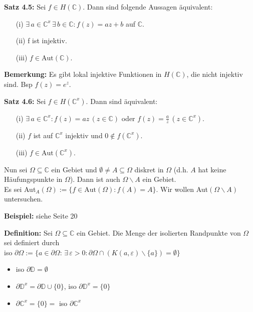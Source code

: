 \documentclass[11pt]{article}
\newcommand{\C}{\mathbb{C}}
\newcommand{\D}{\mathbb{D}}
\begin{document}
\textbf{Satz 4.5:} Sei $f \in H(\C)$. Dann sind folgende Aussagen äquivalent:
\vspace{-0.6cm}
\begin{itemize}
\item[(i)] $\exists \, a \in \C^x \, \exists \, b \in \C \colon f(z) = az + b$ auf $\C$. \vspace{-0.2cm}
\item[(ii)] f ist injektiv. \vspace{-0.2cm}
\item[(iii)] $f \in \text{Aut}(\C)$.
\end{itemize}
\vspace{-0.3cm}

\textbf{Bemerkung:} Es gibt lokal injektive Funktionen in $H(\C)$, die nicht injektiv sind. Bsp $f(z) = e^z$.

\textbf{Satz 4.6:} Sei $f \in H(\C^x)$. Dann sind äquivalent:
\vspace{-0.6cm}
\begin{itemize}
\item[(i)] $\exists \, a \in \C^x \colon f(z) = az \, (z \in \C)$ oder $f(z) = \frac{a}{z} \, (z \in \C^x)$. \vspace{-0.2cm}
\item[(ii)] $f$ ist auf $\C^x$ injektiv und $0 \notin f(\C^x)$. \vspace{-0.2cm}
\item[(iii)] $f \in \text{Aut}(\C^x)$.
\end{itemize}
\vspace{-0.3cm}

Nun sei $\Omega \subseteq \C$ ein Gebiet und $\emptyset \neq A \subseteq \Omega$ diskret in $\Omega$ (d.h. $A$ hat keine Häufungspunkte in $\Omega$). Dann ist auch $\Omega \backslash A$ ein Gebiet. \\
Es sei Aut$_A(\Omega) := \{ f \in \text{Aut}(\Omega) \colon f(A) = A \}$. Wir wollen Aut$(\Omega \backslash A)$ untersuchen. 

\textbf{Beispiel:} siehe Seite 20

\textbf{Definition:} Sei $\Omega \subseteq \C$ ein Gebiet. Die Menge der isolierten Randpunkte von $\Omega$ sei definiert durch \\ 
iso $\partial \Omega := \{ a \in \partial \Omega\colon \, \exists \, \varepsilon > 0 \colon \partial \Omega \cap (K(a, \varepsilon)\backslash \{a\}) = \emptyset \}$
\vspace{-0.6cm}
\begin{itemize}
\item iso $\partial \D = \emptyset$ \vspace{-0.2cm}
\item $\partial \D^x = \partial \D \cup \{0\}$, iso $\partial \D^x = \{ 0 \}$ \vspace{-0.2cm}
\item $\partial \C^x = \{ 0 \} = $ iso $\partial \C^x$
\end{itemize}
\vspace{-0.3cm}
\end{document}
